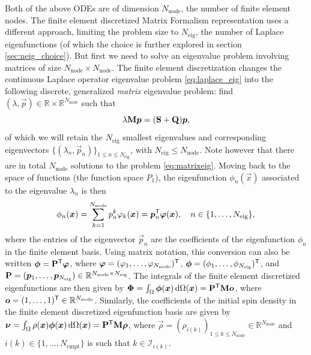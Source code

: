 \documentclass[a4paper]{article}
\begin{document}
Both of the above ODEs are of dimension $N_\text{node}$, the number of finite element nodes. The finite element discretized Matrix Formalism representation uses a different approach, limiting the problem size to $N_\text{eig}$, the number of Laplace eigenfunctions (of which the choice is further explored in section \ref{sec:neig_choice}). But first we need to solve an eigenvalue problem involving matrices of size $N_\text{node}\times N_\text{node}$. The finite element discretization changes the continuous Laplace operator eigenvalue problem \eqref{eq:laplace_eig} into the following discrete, generalized \emph{matrix} eigenvalue problem: find $(\lambda, \vec{p}) \in \mathbb{R} \times \mathbb{R}^{N_\text{node}}$ such that
\begin{equation} \label{eq:matrixeig}
    \lambda \mathbf{M} \bm{p} = (\mathbf{S} + \mathbf{Q}) \bm{p},
\end{equation}
of which we will retain the $N_\text{eig}$ smallest eigenvalues and corresponding eigenvectors $\{(\lambda_n, \vec{p}_n)\}_{1 \leq n \leq N_\text{eig}}$, with $N_\text{eig} \leq N_\text{node}$. Note however that there are in total $N_\text{node}$ solutions to the problem \eqref{eq:matrixeig}. Moving back to the space of functions (the function space $P_1$), the eigenfunction $\phi_n(\vec{x})$ associated to the eigenvalue $\lambda_n$ is then
\begin{equation*}
    \phi_n(\bm{x}) = \sum_{k = 1}^{N_\text{node}} p_n^k \varphi_k(\bm{x}) = \bm{p}_n^{\mathsf{T}} \bm{\varphi}(\bm{x}), \quad n \in \{1, \dots, N_\text{eig}\},
\end{equation*}
where the entries of the eigenvector $\vec{p}_n$ are the coefficients of the eigenfunction $\phi_n$ in the finite element basis. Using matrix notation, this conversion can also be written $\bm{\phi} = \mathbf{P}^{\mathsf{T}} \bm{\varphi}$, where $\bm{\varphi} = (\varphi_1, \dots, \varphi_{N_\text{node}})^{\mathsf{T}}$, $\bm{\phi} = (\phi_1, \dots, \phi_{N_\text{eig}})^{\mathsf{T}}$, and $\mathbf{P} = (\bm{p}_1, \dots, \bm{p}_{N_\text{eig}}) \in \mathbb{R}^{N_\text{node} \times N_\text{eig}}$. The integrals of the finite element discretized eigenfunctions are then given by $\bm{\Phi} = \int_\Omega \bm{\phi}(\bm{x}) \, \mathrm{d} \Omega(\bm{x}) = \mathbf{P}^{\mathsf{T}} \mathbf{M} \bm{o}$, where $\bm{o} = (1, \dots, 1)^{\mathsf{T}} \in \mathbb{R}^{N_\text{node}}$. Similarly, the coefficients of the initial spin density in the finite element discretized eigenfunction basis are given by $\bm{\nu} = \int_\Omega \rho(\bm{x}) \bm{\phi}(\bm{x}) \, \mathrm{d} \Omega(\bm{x}) = \mathbf{P}^{\mathsf{T}} \mathbf{M} \bm{\rho}$, where $\vec{\rho} = (\rho_{i(k)})_{1 \leq k \leq N_\text{node}} \in \mathbb{R}^{N_\text{node}}$ and $i(k) \in \{1, \dots, N_\text{cmpt}\}$ is such that $k \in \mathcal{I}_{i(k)}$.
\end{document}
